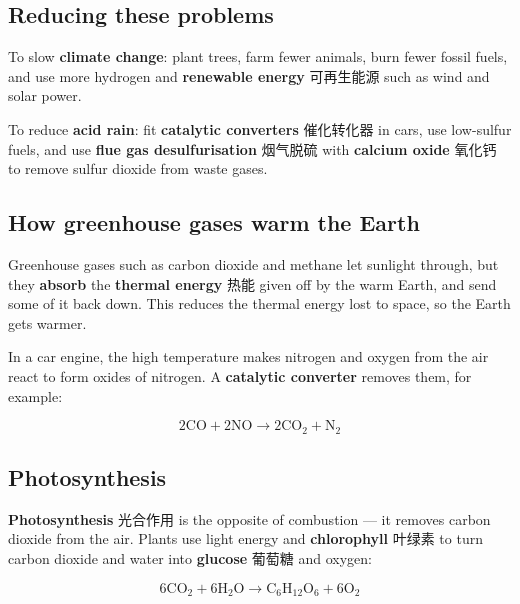 \documentclass[11pt]{article}
\begin{document}
\subsection*{Reducing these problems}

To slow \textbf{climate change}: plant trees, farm fewer animals, burn fewer fossil fuels, and use more hydrogen and \textbf{renewable energy} 可再生能源 such as wind and solar power.

To reduce \textbf{acid rain}: fit \textbf{catalytic converters} 催化转化器 in cars, use low-sulfur fuels, and use \textbf{flue gas desulfurisation} 烟气脱硫 with \textbf{calcium oxide} 氧化钙 to remove sulfur dioxide from waste gases.

\subsection*{How greenhouse gases warm the Earth}

Greenhouse gases such as carbon dioxide and methane let sunlight through, but they \textbf{absorb} the \textbf{thermal energy} 热能 given off by the warm Earth, and send some of it back down. This reduces the thermal energy lost to space, so the Earth gets warmer.

In a car engine, the high temperature makes nitrogen and oxygen from the air react to form oxides of nitrogen. A \textbf{catalytic converter} removes them, for example:

\[
2\text{CO} + 2\text{NO} \rightarrow 2\text{CO}_2 + \text{N}_2
\]

\subsection*{Photosynthesis}

\textbf{Photosynthesis} 光合作用 is the opposite of combustion — it removes carbon dioxide from the air. Plants use light energy and \textbf{chlorophyll} 叶绿素 to turn carbon dioxide and water into \textbf{glucose} 葡萄糖 and oxygen:

\[
6\text{CO}_2 + 6\text{H}_2\text{O} \rightarrow \text{C}_6\text{H}_{12}\text{O}_6 + 6\text{O}_2
\]
\end{document}
